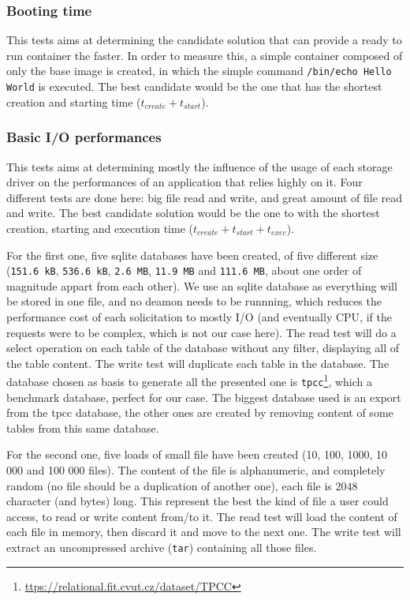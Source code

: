 \subsubsection{Booting time}
This tests aims at determining the candidate solution that can provide a ready to run container the faster.  In order to measure this, a simple container composed of only the base image is created, in which the simple command \texttt{/bin/echo Hello World} is executed.  The best candidate would be the one that has the shortest creation and starting time ($t_{create} + t_{start}$).

\subsubsection{Basic I/O performances}
This tests aims at determining mostly the influence of the usage of each storage driver on the performances of an application that relies highly on it.  Four different tests are done here: big file read and write, and great amount of file read and write.  The best candidate solution would be the one to with the shortest creation, starting and execution time ($t_{create} + t_{start} + t_{exec}$).

For the first one, five sqlite databases have been created, of five different size (\texttt{151.6 kB}, \texttt{536.6 kB}, \texttt{2.6 MB}, \texttt{11.9 MB} and \texttt{111.6 MB}, about one order of magnitude appart from each other).  We use an sqlite database as everything will be stored in one file, and no deamon needs to be runnning, which reduces the performance cost of each solicitation to mostly I/O (and eventually CPU, if the requests were to be complex, which is not our case here).
The read test will do a select operation on each table of the database without any filter, displaying all of the table content.  The write test will duplicate each table in the database.  The database chosen as basis to generate all the presented one is \texttt{tpcc}\footnote{\href{https://relational.fit.cvut.cz/dataset/TPCC}{ttps://relational.fit.cvut.cz/dataset/TPCC}}, which a benchmark database, perfect for our case.  The biggest database used is an export from the tpcc database, the other ones are created by removing content of some tables from this same database.

For the second one, five loads of small file have been created (10, 100, 1000, 10 000 and 100 000 files).  The content of the file is alphanumeric, and completely random (no file should be a duplication of another one), each file is $2048$ character (and bytes) long.  This represent the best the kind of file a user could access, to read or write content from/to it. 
The read test will load the content of each file in memory, then discard it and move to the next one.  The write test will extract an uncompressed archive (\texttt{tar}) containing all those files.

